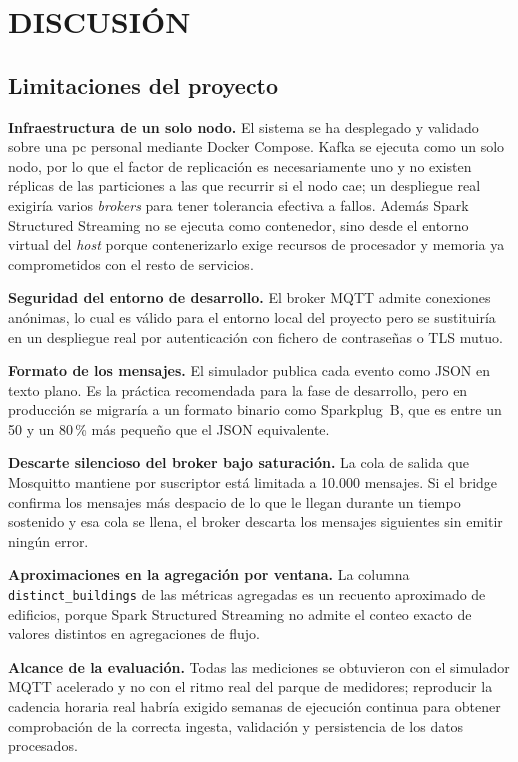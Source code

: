 \chapter{DISCUSIÓN}

\section{Limitaciones del proyecto}

\textbf{Infraestructura de un solo nodo.} El sistema se ha desplegado y validado sobre una pc personal mediante Docker Compose. Kafka se ejecuta como un solo nodo, por lo que el factor de replicación es necesariamente uno y no existen réplicas de las particiones a las que recurrir si el nodo cae; un despliegue real exigiría varios \textit{brokers} para tener tolerancia efectiva a fallos. Además Spark Structured Streaming no se ejecuta como contenedor, sino desde el entorno virtual del \textit{host} porque contenerizarlo exige recursos de procesador y memoria ya comprometidos con el resto de servicios.

\textbf{Seguridad del entorno de desarrollo.} El broker MQTT admite conexiones anónimas, lo cual es válido para el entorno local del proyecto pero se sustituiría en un despliegue real por autenticación con fichero de contraseñas o TLS mutuo.

\textbf{Formato de los mensajes.} El simulador publica cada evento como JSON en texto plano. Es la práctica recomendada para la fase de desarrollo, pero en producción se migraría a un formato binario como Sparkplug~B, que es entre un 50 y un 80\,\% más pequeño que el JSON equivalente.

\textbf{Descarte silencioso del broker bajo saturación.} La cola de salida que Mosquitto mantiene por suscriptor está limitada a 10.000 mensajes. Si el bridge confirma los mensajes más despacio de lo que le llegan durante un tiempo sostenido y esa cola se llena, el broker descarta los mensajes siguientes sin emitir ningún error.

\textbf{Aproximaciones en la agregación por ventana.} La columna \texttt{distinct\_buildings} de las métricas agregadas es un recuento aproximado de edificios, porque Spark Structured Streaming no admite el conteo exacto de valores distintos en agregaciones de flujo.

\textbf{Alcance de la evaluación.} Todas las mediciones se obtuvieron con el simulador MQTT acelerado y no con el ritmo real del parque de medidores; reproducir la cadencia horaria real habría exigido semanas de ejecución continua para obtener comprobación de la correcta ingesta, validación y persistencia de los datos procesados.

